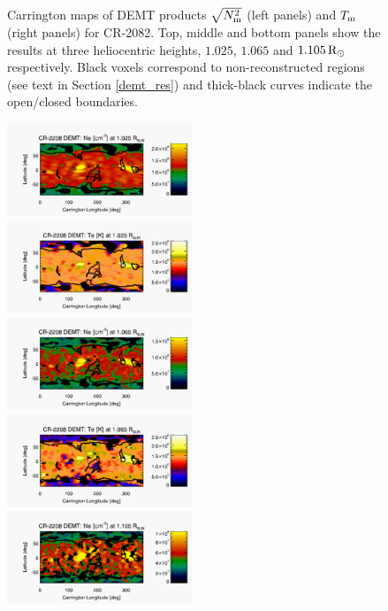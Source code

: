 \documentclass[namedreferences]{solarphysics}
\newcommand{\mrsun}{{\rm R_\odot}}
\newcommand{\Tm}{T_{\rm m}}
\newcommand{\Nsqm}{N^2_{{\rm m}}}
\newcommand{\sqravgN}{\sqrt{\Nsqm}}
\begin{document}
\begin{article}
\begin{figure}[h!]
\begin{center}
\caption{Carrington maps of DEMT {products $\sqravgN$} (left panels) and $\Tm$ (right panels) for CR-2082. Top, middle and bottom panels show the results at three heliocentric heights, $1.025$, $1.065$ and $1.105\,\mrsun$ respectively. Black voxels correspond to non-reconstructed regions (see text in Section \ref{demt_res}) and thick-black curves indicate the open/closed boundaries.}
\label{carmaps_demt_2082}
\end{center}
\end{figure}

\begin{figure}[h!]
\begin{center}
\includegraphics[width=0.495\textwidth]{figs/map_Ne_CR2208_DEMT-AIA_H1_L522_r3d_1025_Rsun.pdf}
\includegraphics[width=0.495\textwidth]{figs/map_Tm_CR2208_DEMT-AIA_H1_L522_r3d_1025_Rsun.pdf}
\includegraphics[width=0.495\textwidth]{figs/map_Ne_CR2208_DEMT-AIA_H1_L522_r3d_1065_Rsun.pdf}
\includegraphics[width=0.495\textwidth]{figs/map_Tm_CR2208_DEMT-AIA_H1_L522_r3d_1065_Rsun.pdf}
\includegraphics[width=0.495\textwidth]{figs/map_Ne_CR2208_DEMT-AIA_H1_L522_r3d_1105_Rsun.pdf}

\end{center}
\end{figure}
\end{article}
\end{document}
